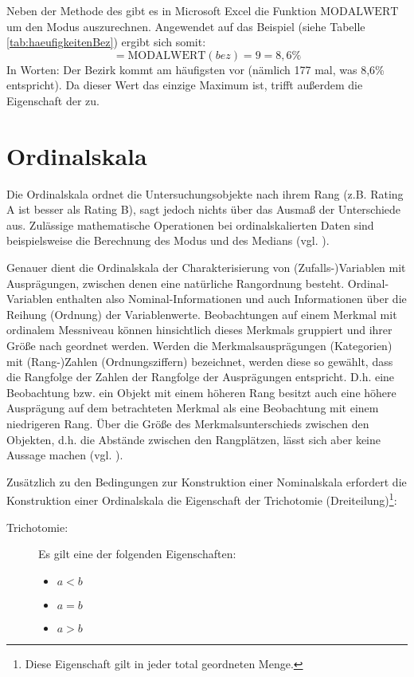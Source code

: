 Neben der Methode des  gibt es in Microsoft Excel die Funktion $\text{MODALWERT}$ um den Modus auszurechnen.
Angewendet auf das Beispiel (siehe Tabelle \ref{tab:haeufigkeitenBez}) ergibt sich somit: \[=\text{MODALWERT}(bez)=9=8,6\%\]
In Worten: Der Bezirk  kommt am häufigsten vor (nämlich 177 mal, was 8,6\% entspricht). Da dieser Wert das einzige Maximum ist, trifft außerdem die Eigenschaft der  zu.

\section{Ordinalskala}
Die Ordinalskala ordnet die Untersuchungsobjekte nach ihrem Rang (z.B. Rating A ist besser als
Rating B), sagt jedoch nichts über das Ausmaß der Unterschiede aus. Zulässige mathematische
Operationen bei ordinalskalierten Daten sind beispielsweise die Berechnung des Modus und des
Medians (vgl. ).

Genauer dient die Ordinalskala der Charakterisierung von (Zufalls-)Variablen mit Ausprägungen,
zwischen denen eine natürliche Rangordnung besteht.
Ordinal-Variablen enthalten also Nominal-Informationen und auch Informationen über die Reihung (Ordnung) der Variablenwerte. 
Beobachtungen auf einem Merkmal mit ordinalem Messniveau können hinsichtlich dieses Merkmals gruppiert und ihrer Größe nach geordnet werden.
Werden die Merkmalsausprägungen (Kategorien) mit (Rang-)Zahlen (Ordnungsziffern) bezeichnet, werden diese so gewählt, 
dass die Rangfolge der Zahlen der Rangfolge der Ausprägungen entspricht. D.h. eine Beobachtung bzw. ein Objekt mit einem höheren Rang besitzt 
auch eine höhere Ausprägung auf dem betrachteten Merkmal als eine Beobachtung mit einem niedrigeren Rang. 
Über die Größe des Merkmalsunterschieds zwischen den Objekten, d.h. die Abstände zwischen den Rangplätzen, 
lässt sich aber keine Aussage machen (vgl. ).


Zusätzlich zu den Bedingungen zur Konstruktion einer Nominalskala erfordert die Konstruktion einer Ordinalskala die Eigenschaft der Trichotomie (Dreiteilung)\footnote{Diese Eigenschaft gilt in jeder total geordneten Menge.}:
\begin{description}
	\item[Trichotomie:] Es gilt eine der folgenden Eigenschaften:
		\begin{itemize}
		  \item $a < b$
		  \item $a = b$
		  \item $a > b$ 
		\end{itemize} 
\end{description}

